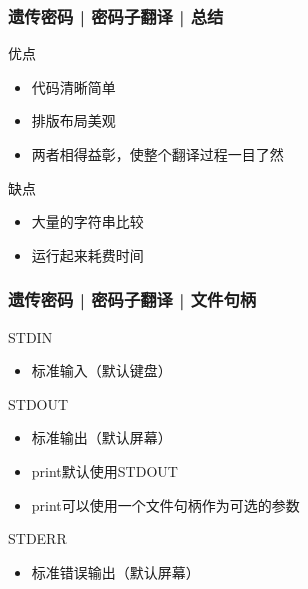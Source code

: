 \begin{frame}
  \frametitle{遗传密码 | 密码子翻译 | 总结}
  \begin{block}{优点}
    \begin{itemize}
      \item 代码清晰简单
      \item 排版布局美观
      \item 两者相得益彰，使整个翻译过程一目了然
    \end{itemize}
  \end{block}
  \pause
  \begin{block}{缺点}
    \begin{itemize}
      \item 大量的字符串比较
      \item 运行起来耗费时间
    \end{itemize}
  \end{block}
\end{frame}

\begin{frame}
  \frametitle{遗传密码 | 密码子翻译 | \alert{文件句柄}}
  \begin{block}{STDIN}
    \begin{itemize}
      \item 标准输入（默认键盘）
    \end{itemize}
  \end{block}
  \pause
  \begin{block}{STDOUT}
    \begin{itemize}
      \item 标准输出（默认屏幕）
      \item print默认使用STDOUT
      \item print可以使用一个文件句柄作为可选的参数
    \end{itemize}
  \end{block}
  \pause
  \begin{block}{STDERR}
    \begin{itemize}
      \item 标准错误输出（默认屏幕）
    \end{itemize}
  \end{block}
\end{frame}

